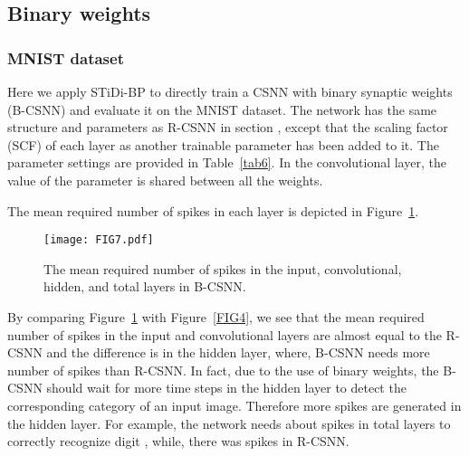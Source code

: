 \documentclass[preprint,twocolumn,5p,12pt]{article}
\begin{document}
\subsection{Binary weights}  
\subsubsection{MNIST dataset}
Here we apply STiDi-BP to directly train a CSNN with binary synaptic weights (B-CSNN)  and evaluate it on the MNIST dataset. 
The network has the same structure and parameters as R-CSNN in section , except that the scaling factor (SCF) of each layer as another trainable parameter has been added to it. 
The parameter settings are provided in Table~\ref{tab6}.
In the convolutional layer, the value of the parameter  is shared between all the weights.

\begin{table}
\begin{center}
\small
\caption{Model parameters for MNIST dataset in B-CSNN.}  \label{tab6}
\end{center}
\end{table}


The mean required number of spikes in each layer is depicted in Figure~\ref{FIG7}. 

\begin{figure}
\centering
\texttt{[image: FIG7.pdf]}
\caption{The mean required number of spikes in the input, convolutional, hidden, and total layers in B-CSNN.} \label{FIG7}
\end{figure}

By comparing Figure~\ref{FIG7} with Figure~\ref{FIG4},
we see that the mean required number of spikes in the input and convolutional layers are almost equal to the R-CSNN and the difference is in the hidden layer, where, B-CSNN needs more number of spikes than R-CSNN.
In fact, due to the use of binary weights, the B-CSNN should wait for more time steps in the hidden layer to detect the corresponding category of an input image. Therefore more spikes are generated in the hidden layer. 
For example, the network needs about  spikes in total layers to correctly recognize digit , while, there was  spikes in R-CSNN.
\end{document}
